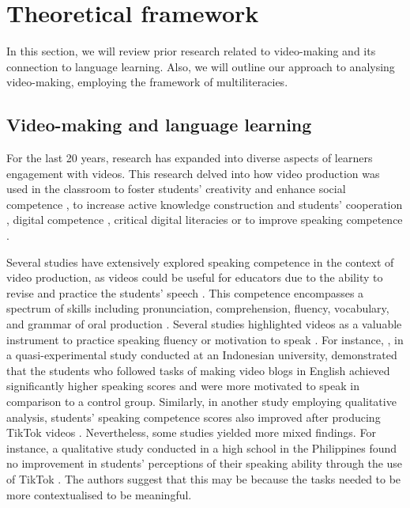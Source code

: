\section{Theoretical framework}\label{sec-theoframework}

In this section, we will review prior research related to video-making
and its connection to language learning. Also, we will outline our
approach to analysing video-making, employing the framework of
multiliteracies.

\subsection{Video-making and language learning}\label{sub-sec-video-making}

For the last 20 years, research has expanded into diverse aspects of
learners\textquotesingle{} engagement with videos. This research delved
into how video production was used in the classroom to foster students'
creativity and enhance social competence \cite{fethi2018}, to
increase active knowledge construction and students' cooperation
\cite{nikitina2010}, digital competence \cite{yeh2018}, critical digital
literacies \cite{delosríos2018} or to improve speaking competence \cite{devana2021}.

Several studies have extensively explored speaking competence in the
context of video production, as videos could be useful for educators due
to the ability to revise and practice the students' speech \cite{cassany2021}. This competence encompasses a spectrum of skills
including pronunciation, comprehension, fluency, vocabulary, and grammar
of oral production \cite{devana2021}. Several studies highlighted
videos as a valuable instrument to practice speaking fluency or
motivation to speak \cite{tan2022}. For instance, \textcite{devana2021}, in a quasi-experimental study conducted at an Indonesian
university, demonstrated that the students who followed tasks of making
video blogs in English achieved significantly higher speaking scores and
were more motivated to speak in comparison to a control group.
Similarly, in another study employing qualitative analysis, students'
speaking competence scores also improved after producing TikTok videos
\cite{zaitun2021}. Nevertheless, some studies yielded more
mixed findings. For instance, a qualitative study conducted in a high
school in the Philippines found no improvement in students' perceptions
of their speaking ability through the use of TikTok \cite{asio2023}. The authors suggest that this may be because the tasks needed to
be more contextualised to be meaningful.

